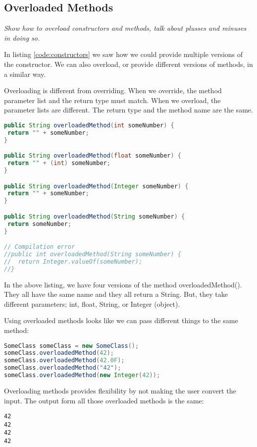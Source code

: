 \subsection{Overloaded Methods}
\textit{Show how to overload constructors and methods, talk about plusses and minuses in doing so.}

In listing \ref{code:constructors} we saw how we could provide multiple versions of the constructor. We can also overload, or provide different versions of methods, in a similar way.

Overloading is different from overriding. When we override, the method parameter list and the return type must match. When we overload, the parameter lists are different. The return type and the method name are the same.

\begin{lstlisting}[language=Java]
public String overloadedMethod(int someNumber) {
 return "" + someNumber;
}

public String overloadedMethod(float someNumber) {
 return "" + (int) someNumber;
}

public String overloadedMethod(Integer someNumber) {
 return "" + someNumber;
}

public String overloadedMethod(String someNumber) {
 return someNumber;
}

// Compilation error
//public int overloadedMethod(String someNumber) {
//  return Integer.valueOf(someNumber);
//}
\end{lstlisting}

In the above listing, we have four versions of the method overloadedMethod(). They all have the same name and they all return a String. But, they take different parameters; int, float, String, or Integer (object).

Using overloaded methods looks like we can pass different things to the same method:
\begin{lstlisting}[language=Java]
SomeClass someClass = new SomeClass();
someClass.overloadedMethod(42);
someClass.overloadedMethod(42.0F);
someClass.overloadedMethod("42");
someClass.overloadedMethod(new Integer(42));
\end{lstlisting}

Overloading methods provides flexibility by not making the user convert the input. The output form all those overloaded methods is the same:
\begin{lstlisting}
42
42
42
42
\end{lstlisting}